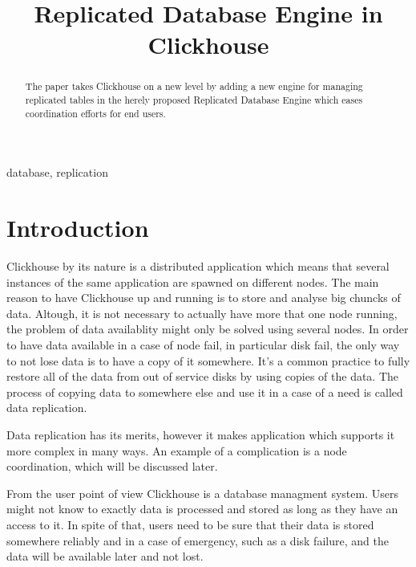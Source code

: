 \documentclass[conference]{IEEEtran}
\begin{document}
\title{Replicated Database Engine in Clickhouse
}

\author{
}

\maketitle

\begin{abstract}
The paper takes Clickhouse on a
new level by adding a new engine for managing replicated tables in the herely
proposed Replicated Database Engine which eases coordination efforts for end users.
\end{abstract}

\begin{IEEEkeywords}
database, replication
\end{IEEEkeywords}

\section{Introduction}

Clickhouse\cite{clickhousedocs} by its nature is a distributed application which means
that several instances of the same application are spawned
on different nodes. The main reason to have Clickhouse up and running is to
store and analyse big chuncks of data. Altough, it is not necessary to actually
have more that one node running, the problem of data availablity might only be solved
using several nodes. In order to have data available in a case of node fail,
in particular disk fail, the only way to not lose data is to have a copy of it
somewhere. It's a common practice to fully restore all of the data
from out of service disks by using copies of the data. The process of copying
data to somewhere else and use it in a case of a need is called data replication.

Data replication has its merits, however it makes application which supports it more
complex in many ways.
An example of a complication is a node coordination, which will be discussed later.

From the user point of view Clickhouse is a database managment system.
Users might not know to exactly data is processed and stored as long as they have
an access to it.
In spite of that, users need to be sure that their data is stored somewhere
reliably and in a case of emergency, such as a disk failure, and the data will be
available later and not lost.
\end{document}
